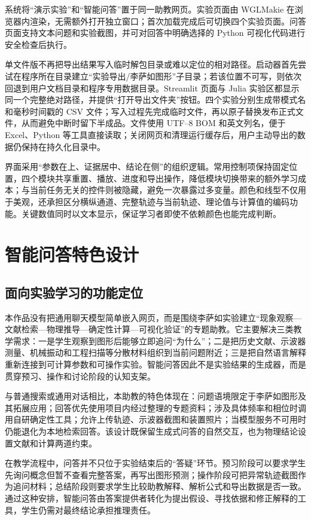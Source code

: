 \documentclass[UTF8,a4paper,zihao=-4]{ctexart}
\begin{document}
系统将“演示实验”和“智能问答”置于同一助教网页。实验页面由 WGLMakie 在浏览器内渲染，无需额外打开独立窗口；首次加载完成后可切换四个实验页面。问答页面支持文本问题和实验截图，并可对回答中明确选择的 Python 可视化代码进行安全检查后执行。

单文件版不再把导出结果写入临时解包目录或难以定位的相对路径。启动器首先尝试在程序所在目录建立“实验导出/李萨如图形”子目录；若该位置不可写，则依次回退到用户文档目录和程序专用数据目录。Streamlit 页面与 Julia 实验区都显示同一个完整绝对路径，并提供“打开导出文件夹”按钮。四个实验分别生成带模式名和毫秒时间戳的 CSV 文件；写入过程先完成临时文件，再以原子替换发布正式文件，从而避免中断时留下半成品。文件使用 UTF--8 BOM 和英文列名，便于 Excel、Python 等工具直接读取；关闭网页和清理运行缓存后，用户主动导出的数据仍保持在持久化目录中。

界面采用“参数在上、证据居中、结论在侧”的组织逻辑。常用控制项保持固定位置，四个模块共享重置、播放、进度和导出操作，降低模块切换带来的额外学习成本；与当前任务无关的控件则被隐藏，避免一次暴露过多变量。颜色和线型不仅用于美观，还承担区分横纵通道、完整轨迹与当前轨迹、理论值与计算值的编码功能。关键数值同时以文本显示，保证学习者即使不依赖颜色也能完成判断。

\section{智能问答特色设计}

\subsection{面向实验学习的功能定位}
本作品没有把通用聊天模型简单嵌入网页，而是围绕李萨如实验建立“现象观察—文献检索—物理推导—确定性计算—可视化验证”的专题助教。它主要解决三类教学需求：一是学生观察到图形后能够立即追问“为什么”；二是把历史文献、示波器测量、机械振动和工程扫描等分散材料组织到当前问题附近；三是把自然语言解释重新连接到可计算参数和可操作实验。智能问答因此不是实验结果的生成器，而是贯穿预习、操作和讨论阶段的认知支架。

与普通搜索或通用对话相比，本助教的特色体现在：问题语境限定于李萨如图形及其拓展应用；回答优先使用项目内经过整理的专题资料；涉及具体频率和相位时调用自研确定性工具；允许上传轨迹、示波器截图和装置照片；当模型服务不可用时仍能退化为本地检索回答。该设计既保留生成式问答的自然交互，也为物理结论设置文献和计算两道约束。

在教学流程中，问答并不只位于实验结束后的“答疑”环节。预习阶段可以要求学生先询问概念但暂不查看完整答案，再写出图形预测；操作阶段可把异常轨迹截图作为追问材料；总结阶段则要求学生比较助教解释、解析公式和导出数据是否一致。通过这种安排，智能问答由答案提供者转化为提出假设、寻找依据和修正解释的工具，学生仍需对最终结论承担推理责任。
\end{document}
